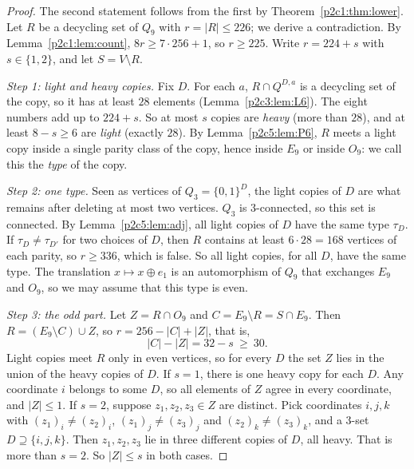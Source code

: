 \begin{proof}
The second statement follows from the first by Theorem~\ref{p2c1:thm:lower}. Let $R$ be a decycling
set of $Q_9$ with $r=|R|\le226$; we derive a contradiction. By Lemma~\ref{p2c1:lem:count},
$8r\ge7\cdot256+1$, so $r\ge225$. Write $r=224+s$ with $s\in\{1,2\}$, and let $S=V\setminus R$.

\emph{Step 1: light and heavy copies.} Fix $D$. For each $a$, $R\cap Q^{D,a}$ is a decycling set
of the copy, so it has at least $28$ elements (Lemma~\ref{p2c3:lem:L6}). The eight numbers add up
to $224+s$. So at most $s$ copies are \emph{heavy} (more than $28$), and at least $8-s\ge6$ are
\emph{light} (exactly $28$). By Lemma~\ref{p2c5:lem:P6}, $R$ meets a light copy inside a single
parity class of the copy, hence inside $E_9$ or inside $O_9$: we call this the \emph{type} of the
copy.

\emph{Step 2: one type.} Seen as vertices of $Q_3=\{0,1\}^D$, the light copies of $D$ are what
remains after deleting at most two vertices. $Q_3$ is $3$-connected, so this set is connected. By
Lemma~\ref{p2c5:lem:adj}, all light copies of $D$ have the same type $\tau_D$. If
$\tau_D\ne\tau_{D'}$ for two choices of $D$, then $R$ contains at least $6\cdot28=168$ vertices of
each parity, so $r\ge336$, which is false. So all light copies, for all $D$, have the same type.
The translation $x\mapsto x\oplus e_1$ is an automorphism of $Q_9$ that exchanges $E_9$ and $O_9$,
so we may assume that this type is even.

\emph{Step 3: the odd part.} Let $Z=R\cap O_9$ and $C=E_9\setminus R=S\cap E_9$. Then
$R=(E_9\setminus C)\cup Z$, so $r=256-|C|+|Z|$, that is,
\begin{equation}\label{p2c5:eq:count}
  |C|-|Z|=32-s\ \ge\ 30 .
\end{equation}
Light copies meet $R$ only in even vertices, so for every $D$ the set $Z$ lies in the union of the
heavy copies of $D$. If $s=1$, there is one heavy copy for each $D$. Any coordinate $i$ belongs to
some $D$, so all elements of $Z$ agree in every coordinate, and $|Z|\le1$. If $s=2$, suppose
$z_1,z_2,z_3\in Z$ are distinct. Pick coordinates $i,j,k$ with $(z_1)_i\ne(z_2)_i$,
$(z_1)_j\ne(z_3)_j$ and $(z_2)_k\ne(z_3)_k$, and a $3$-set $D\supseteq\{i,j,k\}$. Then $z_1,z_2,z_3$
lie in three different copies of $D$, all heavy. That is more than $s=2$. So $|Z|\le s$ in both
cases.


\end{proof}
